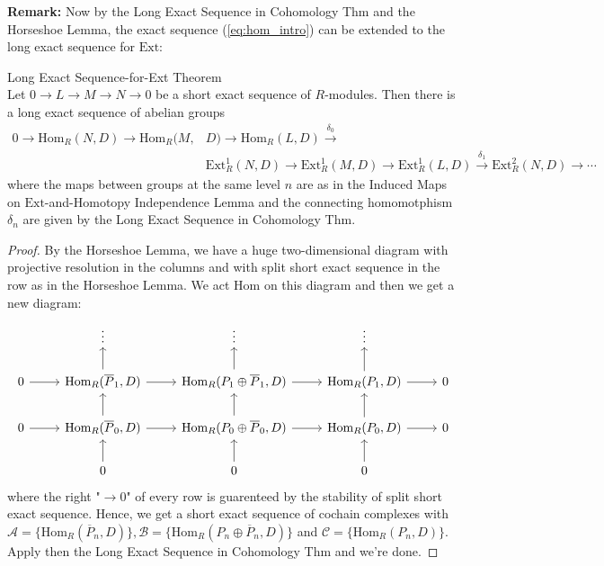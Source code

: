 \noindent\textbf{Remark:} Now by the Long Exact Sequence in Cohomology Thm and the Horseshoe Lemma, the exact sequence (\ref{eq:hom_intro}) can be extended to the long exact sequence for $\text{Ext}$:

\begin{theorem}{Long Exact Sequence-for-Ext Theorem}\\
Let $0\to L\to M\to N\to 0$ be a short exact sequence of $R$-modules. Then there is a long exact sequence of abelian groups
\begin{align*}
    0 \to \text{Hom}_R(N,D) \to \text{Hom}_R(M,&D) \to \text{Hom}_R(L,D) \xrightarrow{\delta_0}\\
    &\text{Ext}_R^1(N,D) \to \text{Ext}_R^1 (M,D) \to \text{Ext}_R^1(L,D) \xrightarrow{\delta_1} \text{Ext}_R^2 (N,D) \to \cdots
\end{align*}
where the maps between groups at the same level $n$ are as in the Induced Maps on $\text{Ext}$-and-Homotopy Independence Lemma and the connecting homomotphism $\delta_n$ are given by the Long Exact Sequence in Cohomology Thm.
\end{theorem}

\begin{proof}
    By the Horseshoe Lemma, we have a huge two-dimensional diagram with projective resolution in the columns and with split short exact sequence in the row as in the Horseshoe Lemma. We act $\text{Hom}$ on this diagram and then we get a new diagram:
    \[
    \begin{tikzcd}
        &\vdots&\vdots&\vdots\\
        0\arrow[r]& \text{Hom}_R(\overline{P}_1,D) \arrow[u] \arrow[r] &\text{Hom}_R (P_1 \oplus \overline{P}_1,D) \arrow[u] \arrow[r] &\text{Hom}_R (P_1,D) \arrow[r] \arrow[u] &0\\
        0\arrow[r]& \text{Hom}_R(\overline{P}_0,D) \arrow[u] \arrow[r] &\text{Hom}_R (P_0 \oplus \overline{P}_0,D) \arrow[u] \arrow[r] &\text{Hom}_R (P_0,D) \arrow[r] \arrow[u] &0\\
        &0\arrow[u] &0\arrow[u]& 0\arrow[u]
    \end{tikzcd}
    \]
    where the right "$\rightarrow0$" of every row is guarenteed by the stability of split short exact sequence. Hence, we get a short exact sequence of cochain complexes with $\mathcal{A}=\{ \text{Hom}_R (\overline{P}_n,D) \}, \mathcal{B} =\{\text{Hom}_R(P_n \oplus \overline{P}_n,D) \}$ and $\mathcal{C}=\{ \text{Hom}_R(P_n,D) \}$. Apply then the Long Exact Sequence in Cohomology Thm and we're done.
\end{proof}

